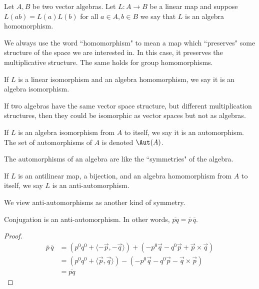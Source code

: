 \begin{defn}
Let $A,B$ be two vector algebras. Let $L : A\to B$ be a linear map and suppose $L(ab)=L(a)L(b)$ for all $a\in A,b\in B$ we say that $L$ is an algebra homomorphism.
\end{defn}
\begin{remark*}
We always use the word ``homomorphism" to mean a map which ``preserves" some structure of the space we are interested in. In this case, it preserves the multiplicative structure. The same holds for group homomorphisms. 
\end{remark*}
\begin{defn}
    If $L$ is a linear isomorphism and an algebra homomorphism, we say it is an algebra isomorphism.
\end{defn}
\begin{remark*}
    If two algebras have the same vector space structure, but different multiplication structures, then they could be isomorphic as vector spaces but not as algebras.
\end{remark*}
\begin{defn}[Automorphism]
    If $L$ is an algebra isomorphism from $A$ to itself, we say it is an automorphism. The set of automorphisms of $A$ is denoted $\Aut(A)$.
\end{defn}
\begin{remark*}
    The automorphisms of an algebra are like the ``symmetries" of the algebra.
\end{remark*}
\begin{defn}
    If $L$ is an antilinear map, a bijection, and an algebra homomorphism from $A$ to itself, we say $L$ is an anti-automorphism.
\end{defn}
\begin{remark*}
    We view anti-automorphisms as another kind of symmetry.
\end{remark*}
\begin{lemma}
    Conjugation is an anti-automorphism. In other words, $\overline{pq}=\overline{p}\,\overline{q}$.
\end{lemma}
\begin{proof}
    \begin{align*}
        \overline{p}\,\overline{q} &= (p^0q^0+\langle-\vec{p},-\vec{q}\rangle )+(-p^0\vec{q}-q^0\vec{p}+\vec{p}\times\vec{q})\\
        &= (p^0q^0 +\langle\vec{p},\vec{q}\rangle )-(-p^0\vec{q}-q^0\vec{p}-\vec{q}\times\vec{p})\\
        &= \overline{pq}
    \end{align*}
\end{proof}
